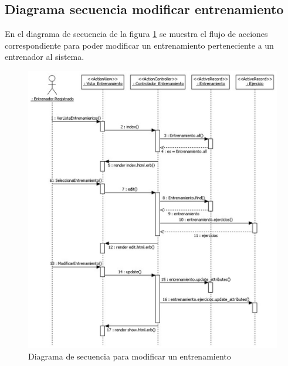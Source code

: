 		  \newpage
		
		\subsection{Diagrama secuencia modificar entrenamiento} %
		  \label{sub:diagrama_secuencia_modificar_entrenamiento}
		  
		  En el diagrama de secuencia de la figura \ref{fig:di_sec_modificarentrenamiento} se muestra el flujo de acciones correspondiente para poder modificar un entrenamiento perteneciente a un entrenador al sistema.
		  
		  \begin{figure}[H]
			  \centering
			    \includegraphics[width=15cm]{./eps/di_diagsecuencia/Entrenamiento_Modificar.eps}
			  \caption{Diagrama de secuencia para modificar un entrenamiento}
			  \label{fig:di_sec_modificarentrenamiento}
			\end{figure}
			
			\newpage
		
